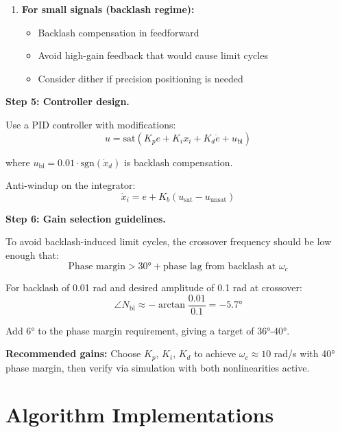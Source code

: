 \begin{example}
\begin{enumerate}
    \item \textbf{For small signals (backlash regime):}
    \begin{itemize}
        \item Backlash compensation in feedforward
        \item Avoid high-gain feedback that would cause limit cycles
        \item Consider dither if precision positioning is needed
    \end{itemize}
\end{enumerate}

\textbf{Step 5: Controller design.}

Use a PID controller with modifications:
\begin{equation}
u = \text{sat}\left(K_p e + K_i x_i + K_d \dot{e} + u_{\text{bl}}\right)
\end{equation}

where $u_{\text{bl}} = 0.01 \cdot \text{sgn}(\dot{x}_d)$ is backlash compensation.

Anti-windup on the integrator:
\begin{equation}
\dot{x}_i = e + K_b(u_{\text{sat}} - u_{\text{unsat}})
\end{equation}

\textbf{Step 6: Gain selection guidelines.}

To avoid backlash-induced limit cycles, the crossover frequency should be low enough that:
\begin{equation}
\text{Phase margin} > 30° + \text{phase lag from backlash at } \omega_c
\end{equation}

For backlash of 0.01 rad and desired amplitude of 0.1 rad at crossover:
\begin{equation}
\angle N_{\text{bl}} \approx -\arctan\frac{0.01}{0.1} = -5.7°
\end{equation}

Add 6° to the phase margin requirement, giving a target of 36°-40°.

\textbf{Recommended gains:} Choose $K_p$, $K_i$, $K_d$ to achieve $\omega_c \approx 10$ rad/s with 40° phase margin, then verify via simulation with both nonlinearities active.
\end{example}

\section{Algorithm Implementations}
\label{sec:algorithms}

